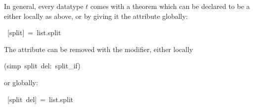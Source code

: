 \begin{isabelle}
\begin{isamarkuptext}
In general, every datatype $t$ comes with a theorem
 which can be declared to be a  either
locally as above, or by giving it the  attribute globally:%
\end{isamarkuptext}%
\ [split]\ =\ list.split%
\begin{isamarkuptext}%
\noindent
The  attribute can be removed with the  modifier,
either locally%
\end{isamarkuptext}%
(simp\ split\ del:\ split\_if)%
\begin{isamarkuptext}%
\noindent
or globally:%
\end{isamarkuptext}%
\ [split\ del]\ =\ list.split\isanewline
\end{isabelle}%
